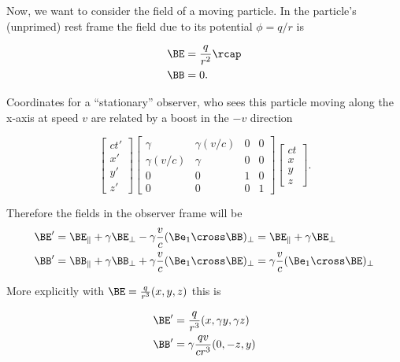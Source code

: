 Now, we want to consider the field of a moving particle.  In the particle's (unprimed) rest frame the field due to its potential $\phi = q/r$ is

\begin{align}\label{eqn:relElectroDynProblemSet3:1400}
\BE &= \frac{q}{r^2} \rcap \\
\BB &= 0.
\end{align}

Coordinates for a ``stationary'' observer, who sees this particle moving along the x-axis at speed $v$ are related by a boost in the $-v$ direction

\begin{equation}\label{eqn:relElectroDynProblemSet3:1420}
\begin{bmatrix}
ct' \\
x' \\
y' \\
z'
\end{bmatrix}
\begin{bmatrix}
\gamma & \gamma (v/c) & 0 & 0 \\
\gamma (v/c) & \gamma & 0 & 0 \\
0 & 0 & 1 & 0 \\
0 & 0 & 0 & 1
\end{bmatrix}
\begin{bmatrix}
ct \\
x \\
y \\
z
\end{bmatrix}.
\end{equation}

Therefore the fields in the observer frame will be
\begin{align}\label{eqn:relElectroDynProblemSet3:1440}
\BE' &= \BE_\parallel + \gamma \BE_\perp - \gamma \frac{v}{c}(\Be_1 \cross \BB)_\perp = \BE_\parallel + \gamma \BE_\perp \\
\BB' &= \BB_\parallel + \gamma \BB_\perp + \gamma \frac{v}{c}(\Be_1 \cross \BE)_\perp = \gamma \frac{v}{c}(\Be_1 \cross \BE)_\perp 
\end{align}

More explicitly with $\BE = \frac{q}{r^3}(x, y, z)$ this is

\begin{align}\label{eqn:relElectroDynProblemSet3:1460}
\BE' &= \frac{q}{r^3}(x, \gamma y, \gamma z) \\
\BB' &= \gamma \frac{q v}{c r^3} ( 0, -z, y )
\end{align}

